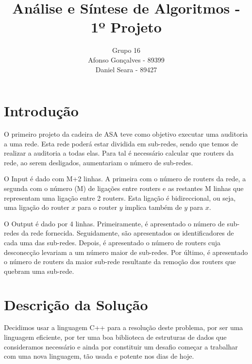 \documentclass[12pt]{article}
\begin{document}
\title{Análise e Síntese de Algoritmos - 1º Projeto}
\author{Grupo 16 \\ Afonso Gonçalves - 89399 \\ Daniel Seara - 89427}
\date{}
\maketitle


\thispagestyle{fancy}


\section{Introdução}
    \par
    O primeiro projeto da cadeira de ASA teve como objetivo executar uma auditoria a uma rede. Esta rede poderá estar dividida em sub-redes, 
    sendo que temos de realizar a auditoria a todas elas. Para tal é necessário calcular que routers da rede, ao serem desligados, aumentariam o número de
    sub-redes.
    \par
    O Input é dado com M+2 linhas. A primeira com o número de routers da rede, a segunda com o número (M) de ligações entre routers e as restantes M linhas que 
    representam uma ligação entre 2 routers. Esta ligação é bidireccional, ou seja, uma ligação do router $x$ para o router $y$ implica também de 
    $y$ para $x$.
    \par
    O Output é dado por 4 linhas. Primeiramente, é apresentado o número de sub-redes da rede fornecida. Seguidamente, são apresentados os identificadores de cada 
    uma das sub-redes. Depois, é apresentado o número de routers cuja desconecção levariam a um número maior de sub-redes. Por último, é apresentado o número de routers 
    da maior sub-rede resultante da remoção dos routers que quebram uma sub-rede.

\section{Descrição da Solução}
    \par
    Decidimos usar a linguagem C++ para a resolução deste problema,
    por ser uma linguagem eficiente, por ter uma boa biblioteca de estruturas de dados 
    que consideramos necessário e ainda por constituir um desafio começar a trabalhar 
    com uma nova linguagem, tão usada e potente nos dias de hoje.
\end{document}
